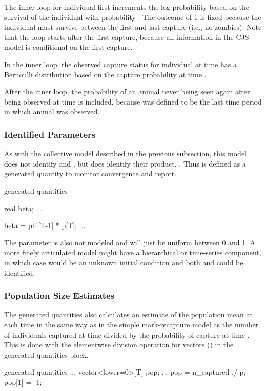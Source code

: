 The inner loop for individual  first increments the log
probability based on the survival of the individual with probability
.  The outcome of 1 is fixed because the individual
must survive between the first and last capture (i.e., no zombies).
Note that the loop starts after the first capture, because all
information in the CJS model is conditional on the first capture.

In the inner loop, the observed capture status  for
individual  at time  has a Bernoulli distribution
based on the capture probability  at time .

After the inner loop, the probability of an animal never being seen
again after being observed at time  is included, because
 was defined to be the last time period in which animal
 was observed.

\subsubsection{Identified Parameters}

As with the collective model described in the previous subsection,
this model does not identify  and , but
does identify their product, .  Thus  is defined
as a generated quantity to monitor convergence and report.
%
\begin{stancode}
generated quantities {
  real beta;
  ...

  beta = phi[T-1] * p[T];
  ...
}
\end{stancode}
%

The parameter  is also not modeled and will just be uniform
between 0 and 1.  A more finely articulated model might have a
hierarchical or time-series component, in which case  would
be an unknown initial condition and both  and
 could be identified.

\subsubsection{Population Size Estimates}

The generated quantities also calculates an estimate of the population
mean at each time  in the same way as in the simple
mark-recapture model as the number of individuals captured at time
 divided by the probability of capture at time .  This
is done with the elementwise division operation for vectors
() in the generated quantities block.
%
\begin{stancode}
generated quantities {
  ...
  vector<lower=0>[T] pop;
  ...
  pop = n_captured ./ p;
  pop[1] = -1;
}
\end{stancode}

